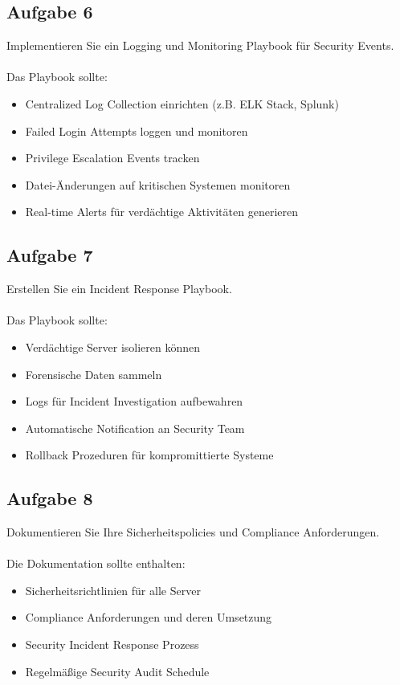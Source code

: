\documentclass{article}
\begin{document}
    \subsection{Aufgabe 6}
    Implementieren Sie ein Logging und Monitoring Playbook für Security Events.
    \\ \\
    Das Playbook sollte:
    \begin{itemize}
        \item Centralized Log Collection einrichten (z.B. ELK Stack, Splunk)
        \item Failed Login Attempts loggen und monitoren
        \item Privilege Escalation Events tracken
        \item Datei-Änderungen auf kritischen Systemen monitoren
        \item Real-time Alerts für verdächtige Aktivitäten generieren
    \end{itemize}

    \subsection{Aufgabe 7}
    Erstellen Sie ein Incident Response Playbook.
    \\ \\
    Das Playbook sollte:
    \begin{itemize}
        \item Verdächtige Server isolieren können
        \item Forensische Daten sammeln
        \item Logs für Incident Investigation aufbewahren
        \item Automatische Notification an Security Team
        \item Rollback Prozeduren für kompromittierte Systeme
    \end{itemize}

    \subsection{Aufgabe 8}
    Dokumentieren Sie Ihre Sicherheitspolicies und Compliance Anforderungen.
    \\ \\
    Die Dokumentation sollte enthalten:
    \begin{itemize}
        \item Sicherheitsrichtlinien für alle Server
        \item Compliance Anforderungen und deren Umsetzung
        \item Security Incident Response Prozess
        \item Regelmäßige Security Audit Schedule
    \end{itemize}
\end{document}
